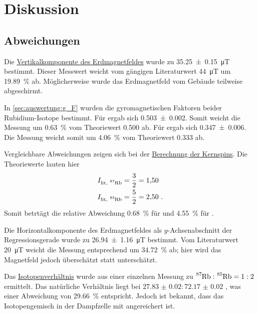 \section{Diskussion}
\label{sec:diskussion}

\subsection{Abweichungen}

Die \hyperref[sec:auswertung:B_erd_vert]{Vertikalkomponente des Erdmagnetfeldes}
wurde zu \SI{35.25 \pm 0.15}{\micro\tesla} bestimmt.
Dieser Messwert weicht vom gängigen Literaturwert \SI{44}{\micro\tesla} \cite{erdmagnetfeld}
um \SI{19.89}{\percent} ab.
Möglicherweise wurde das Erdmagnetfeld vom Gebäude teilweise abgeschirmt.


In \autoref{sec:auswertung:g_F} wurden die gyromagnetischen Faktoren beider Rubidium-Isotope bestimmt.
Für  ergab sich \num{0.503 \pm 0.002}.
Somit weicht die Messung um \SI{0.63}{\percent} vom Theoriewert \num{0.500} ab.
Für  ergab sich \num{0.347 \pm 0.006}.
Die Messung weicht somit um \SI{4.06}{\percent} vom Theoriewert \num{0.333} ab.


Vergleichbare Abweichungen zeigen sich bei der \hyperref[sec:auswertung:kernspin]{Berechnung der Kernspins}.
Die Theoriewerte lauten hier
\begin{align*}
    I_\text{lit, \Rb{87}} &= \frac{3}{2} = \num{1.50} \\
    I_\text{lit, \Rb{85}} &= \frac{5}{2} = \num{2.50} \ .
\end{align*}
Somit betrtägt die relative Abweichung
\SI{0.68}{\percent} für  und
\SI{4.55}{\percent} für .


Die Horizontalkomponente des Erdmagnetfeldes
als $y$-Achsenabschnitt der Regressionsgerade
wurde zu \SI{26.94 \pm 1.16}{\micro\tesla} bestimmt.
Vom Literaturwert \SI{20}{\micro\tesla} \cite{erdmagnetfeld}
weicht die Messung entsprechend um \SI{34.72}{\percent} ab;
hier wird das Magnetfeld jedoch überschätzt statt unterschätzt.


Das \hyperref[sec:auswertung:isotopenverhaeltnis]{Isotopenverhältnis}
wurde aus einer einzelnen Messung zu
\def\verh#1#2{#1 : #2}
$\verh{\Rb{87}}{\Rb{85}} = \verh{1}{2}$
ermittelt.
Das natürliche Verhältnis liegt bei
$\verh{\num{27.83(2)}}{\num{72.17(2)}}$ \cite{isotopenverhaeltnis},
was einer Abweichung von \SI{29.66}{\percent} entspricht.
Jedoch ist bekannt, dass das Isotopengemisch in der Dampfzelle mit  angereichert ist.


